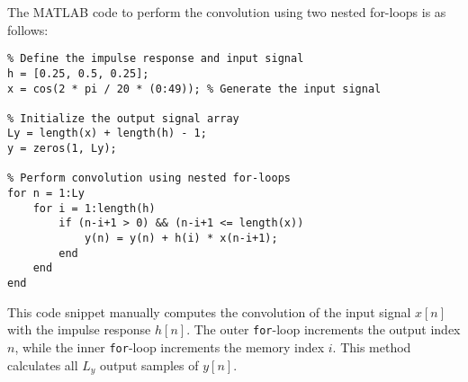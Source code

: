 
\item[(b)]
The MATLAB code to perform the convolution using two nested for-loops is as follows:

\begin{verbatim}
% Define the impulse response and input signal
h = [0.25, 0.5, 0.25];
x = cos(2 * pi / 20 * (0:49)); % Generate the input signal

% Initialize the output signal array
Ly = length(x) + length(h) - 1;
y = zeros(1, Ly);

% Perform convolution using nested for-loops
for n = 1:Ly
    for i = 1:length(h)
        if (n-i+1 > 0) && (n-i+1 <= length(x))
            y(n) = y(n) + h(i) * x(n-i+1);
        end
    end
end
\end{verbatim}

This code snippet manually computes the convolution of the input signal $x[n]$ with the impulse response $h[n]$.
The outer \texttt{for}-loop increments the output index $n$, while the inner \texttt{for}-loop increments the memory index $i$.
This method calculates all $L_y$ output samples of $y[n]$.
